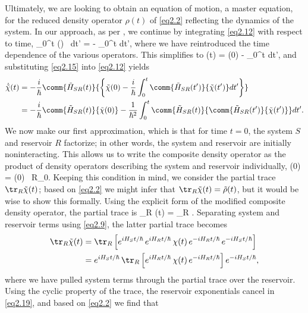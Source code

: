 Ultimately, we are looking to obtain an equation of motion, a master equation, for the reduced density operator $\rho(t)$ of \eqref{eq2.2} reflecting the dynamics of the system. In our approach, as per \cite{howard1}, we continue by integrating \eqref{eq2.12} with respect to time,
%
\be \int_0^t  (\tilde{\chi}) \, dt' = - \int_0^t  dt', \label{eq2.14} \ee
%
where we have reintroduced the time dependence of the various operators. This simplifies to
%
\be \tilde{\chi}(t) = \tilde{\chi}(0) -  \int_0^t  dt', \label{eq2.15} \ee
%
and substituting \eqref{eq2.15} into \eqref{eq2.12} yields
%
\begin{align} \dot{\tilde{\chi}}(t) &= -\frac{i}{\hbar} \comm{\tilde{H}_{SR}(t)}{\left\{ \tilde{\chi}(0) - \frac{i}{\hbar} \int_0^t \comm{\tilde{H}_{SR}(t')}{\tilde{\chi}(t')} dt' \right\}} \nonumber \\
&= -\frac{i}{\hbar} \comm{\tilde{H}_{SR}(t)}{\tilde{\chi}(0)} - \frac{1}{\hbar^2} \int_0^t \comm{\tilde{H}_{SR}(t)}{\comm{\tilde{H}_{SR}(t')}{\tilde{\chi}(t')}} dt'. \label{eq2.16} \end{align}
%
We now make our first approximation, which is that for time $t = 0$, the system $S$ and reservoir $R$ factorize; in other words, the system and reservoir are initially noninteracting. This allows us to write the composite density operator as the product of density operators describing the system and reservoir individually,
%
\be \chi(0) = \rho(0) \, R_0. \label{eq2.17} \ee
%
Keeping this condition in mind, we consider the partial trace $\tr_R \tilde{\chi}(t)$; based on \eqref{eq2.2} we might infer that $\tr_R \tilde{\chi}(t) = \tilde{\rho}(t)$, but it would be wise to show this formally. Using the explicit form of the modified composite density operator, the partial trace is
%
\be \tr_R \tilde{\chi}(t) = \tr_R . \label{eq2.18} \ee
%
Separating system and reservoir terms using \eqref{eq2.9}, the latter partial trace becomes
%
\begin{align} \tr_R \tilde{\chi}(t) &= \tr_R \left[ e^{iH_S t/\hbar} \, e^{iH_R t/\hbar} \, \chi(t) \, e^{-iH_R t/\hbar} \, e^{-iH_S t/\hbar} \right] \nonumber \\
&= e^{iH_S t/\hbar} \, \tr_R \left[ e^{iH_R t/\hbar} \, \chi(t) \, e^{-iH_R t/\hbar} \right] e^{-iH_S t/\hbar}, \label{eq2.19} \end{align}
%
where we have pulled system terms through the partial trace over the reservoir. Using the cyclic property of the trace, the reservoir exponentials cancel in \eqref{eq2.19}, and based on \eqref{eq2.2} we find that
